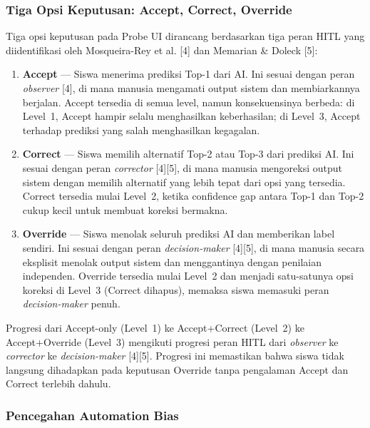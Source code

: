 \documentclass[12pt,oneside]{report}
\begin{document}
\subsubsection{Tiga Opsi Keputusan: Accept, Correct, Override}

Tiga opsi keputusan pada Probe UI dirancang berdasarkan tiga peran HITL yang diidentifikasi oleh Mosqueira-Rey et al. [4] dan Memarian \& Doleck [5]:

\begin{enumerate}
    \item \textbf{Accept} --- Siswa menerima prediksi Top-1 dari AI. Ini sesuai dengan peran \textit{observer} [4], di mana manusia mengamati output sistem dan membiarkannya berjalan. Accept tersedia di semua level, namun konsekuensinya berbeda: di Level~1, Accept hampir selalu menghasilkan keberhasilan; di Level~3, Accept terhadap prediksi yang salah menghasilkan kegagalan.
    \item \textbf{Correct} --- Siswa memilih alternatif Top-2 atau Top-3 dari prediksi AI. Ini sesuai dengan peran \textit{corrector} [4][5], di mana manusia mengoreksi output sistem dengan memilih alternatif yang lebih tepat dari opsi yang tersedia. Correct tersedia mulai Level~2, ketika confidence gap antara Top-1 dan Top-2 cukup kecil untuk membuat koreksi bermakna.
    \item \textbf{Override} --- Siswa menolak seluruh prediksi AI dan memberikan label sendiri. Ini sesuai dengan peran \textit{decision-maker} [4][5], di mana manusia secara eksplisit menolak output sistem dan menggantinya dengan penilaian independen. Override tersedia mulai Level~2 dan menjadi satu-satunya opsi koreksi di Level~3 (Correct dihapus), memaksa siswa memasuki peran \textit{decision-maker} penuh.
\end{enumerate}

Progresi dari Accept-only (Level~1) ke Accept+Correct (Level~2) ke Accept+Override (Level~3) mengikuti progresi peran HITL dari \textit{observer} ke \textit{corrector} ke \textit{decision-maker} [4][5]. Progresi ini memastikan bahwa siswa tidak langsung dihadapkan pada keputusan Override tanpa pengalaman Accept dan Correct terlebih dahulu.

\subsubsection{Pencegahan Automation Bias}
\end{document}

